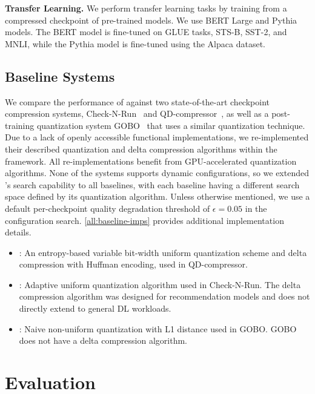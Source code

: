 \noindent\textbf{Transfer Learning.} We perform transfer learning tasks by training from a compressed checkpoint of pre-trained models. We use BERT Large and Pythia models. The BERT model is fine-tuned on GLUE  tasks, STS-B, SST-2, and MNLI, while the Pythia model is fine-tuned using the Alpaca dataset.%



\subsection{Baseline Systems}


We compare the performance of \sys against two state-of-the-art checkpoint compression systems, Check-N-Run~\cite{checknrun} and QD-compressor~\cite{QD}, as well as a post-training quantization system GOBO~\cite{gobo} that uses a similar quantization technique. Due to a lack of openly accessible functional implementations, we re-implemented their described quantization and delta compression algorithms within the \sys framework. All re-implementations benefit from GPU-accelerated quantization algorithms. None of the systems supports dynamic configurations, so we extended \sys's search capability to all baselines, with each baseline having a different search space defined by its quantization algorithm. Unless otherwise mentioned, we use a default per-checkpoint quality degradation threshold of $\epsilon=0.05$ in the configuration search. \cref{all:baseline-imps} provides additional implementation details. 


\begin{itemize}
\item \QD: An entropy-based variable bit-width uniform quantization scheme and delta compression with Huffman encoding, used in QD-compressor. 
\item \CNR: Adaptive uniform quantization \cite{adaptive-uniform-quant} algorithm used in Check-N-Run. The delta compression algorithm was designed for recommendation models and does not directly extend to general DL workloads.
\item \GOBO: Naive \kmeans non-uniform quantization with L1 distance used in GOBO. GOBO does not have a delta compression algorithm. 
\end{itemize}


\section{Evaluation}
\label{sec:evaluation}


